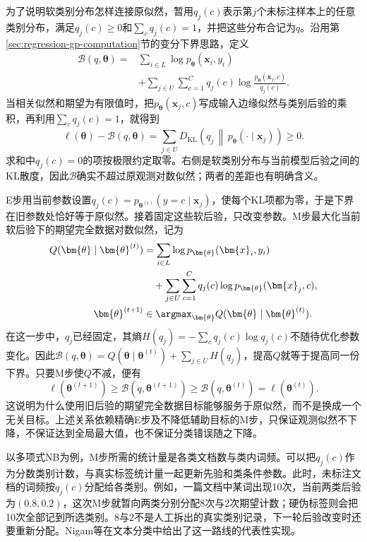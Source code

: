 为了说明软类别分布怎样连接原似然，暂用$q_j(c)$表示第$j$个未标注样本上的任意类别分布，满足$q_j(c)\geq0$和$\sum_cq_j(c)=1$，并把这些分布合记为$q$。沿用第\ref{sec:regression-gp-computation}节的变分下界思路，定义
\begin{equation}
  \label{eq:classification-semisupervised-em-bound}
  \begin{aligned}
    \mathcal B(q,\bm\theta)
      ={}&\sum_{i\in L}\log p_{\bm\theta}(\bm x_i,y_i)\\
        &+\sum_{j\in U}\sum_{c=1}^{C}
          q_j(c)\log\frac{p_{\bm\theta}(\bm x_j,c)}{q_j(c)}.
  \end{aligned}
\end{equation}
当相关似然和期望为有限值时，把$p_{\bm\theta}(\bm x_j,c)$写成输入边缘似然与类别后验的乘积，再利用$\sum_cq_j(c)=1$，就得到
\[
  \ell(\bm\theta)-\mathcal B(q,\bm\theta)
    =\sum_{j\in U}D_{\mathrm{KL}}\!\left(
       q_j\,\middle\|\,p_{\bm\theta}(\cdot\mid\bm x_j)\right)
    \geq0.
\]
求和中$q_j(c)=0$的项按极限约定取零。右侧是软类别分布与当前模型后验之间的KL散度，因此$\mathcal B$确实不超过原观测对数似然；两者的差距也有明确含义。

E步用当前参数设置$q_j(c)=p_{\bm{\theta}^{(t)}}(y=c\mid\bm{x}_j)$，使每个KL项都为零，于是下界在旧参数处恰好等于原似然。接着固定这些软后验，只改变参数。M步最大化当前软后验下的期望完全数据对数似然，记为
\[
  \begin{aligned}
    Q(\bm{\theta}\mid\bm{\theta}^{(t)})
    &=
    \sum_{i\in L}\log p_{\bm{\theta}}(\bm{x}_i,y_i) \\
    &\quad+
    \sum_{j\in U}\sum_{c=1}^{C}
      q_j(c)\log p_{\bm{\theta}}(\bm{x}_j,c), \\
    \bm{\theta}^{(t+1)}
    &\in\argmax_{\bm{\theta}}
      Q(\bm{\theta}\mid\bm{\theta}^{(t)}).
  \end{aligned}
\]
在这一步中，$q_j$已经固定，其熵$H(q_j)=-\sum_cq_j(c)\log q_j(c)$不随待优化参数变化。因此$\mathcal B(q,\bm\theta)=Q(\bm\theta\mid\bm\theta^{(t)})+\sum_{j\in U}H(q_j)$，提高$Q$就等于提高同一份下界。只要M步使$Q$不减，便有
\[
  \ell(\bm\theta^{(t+1)})
    \geq\mathcal B(q,\bm\theta^{(t+1)})
    \geq\mathcal B(q,\bm\theta^{(t)})
    =\ell(\bm\theta^{(t)}).
\]
这说明为什么使用旧后验的期望完全数据目标能够服务于原似然，而不是换成一个无关目标。上述关系依赖精确E步及不降低辅助目标的M步，只保证观测似然不下降，不保证达到全局最大值，也不保证分类错误随之下降。

以多项式NB为例，M步所需的统计量是各类文档数与类内词频。可以把$q_j(c)$作为分数类别计数，与真实标签统计量一起更新先验和类条件参数。此时，未标注文档的词频按$q_j(c)$分配给各类别。例如，一篇文档中某词出现10次，当前两类后验为$(0.8,0.2)$，这次M步就暂向两类分别分配8次与2次期望计数；硬伪标签则会把10次全部记到所选类别。8与2不是人工拆出的真实类别记录，下一轮后验改变时还要重新分配。Nigam等在文本分类中给出了这一路线的代表性实现。

